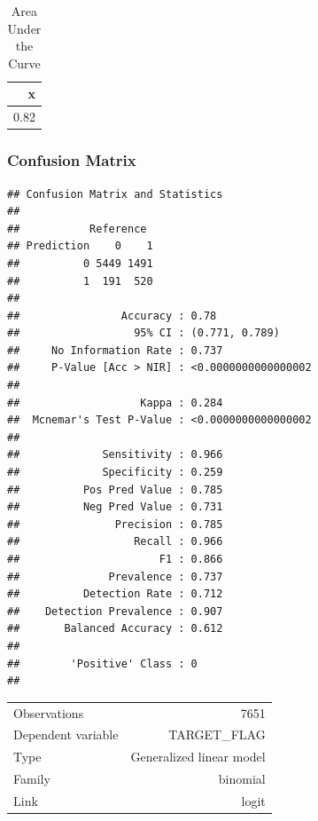 \documentclass[]{article}
\begin{document}
\begin{table}

\caption{\label{tab:t9}Area Under the Curve}
\centering
\begin{tabular}[t]{r}
\hline
x\\
\hline
0.82\\
\hline
\end{tabular}
\end{table}

\subsubsection{Confusion Matrix}\label{confusion-matrix-2}

\begin{verbatim}
## Confusion Matrix and Statistics
## 
##           Reference
## Prediction    0    1
##          0 5449 1491
##          1  191  520
##                                              
##                Accuracy : 0.78               
##                  95% CI : (0.771, 0.789)     
##     No Information Rate : 0.737              
##     P-Value [Acc > NIR] : <0.0000000000000002
##                                              
##                   Kappa : 0.284              
##  Mcnemar's Test P-Value : <0.0000000000000002
##                                              
##             Sensitivity : 0.966              
##             Specificity : 0.259              
##          Pos Pred Value : 0.785              
##          Neg Pred Value : 0.731              
##               Precision : 0.785              
##                  Recall : 0.966              
##                      F1 : 0.866              
##              Prevalence : 0.737              
##          Detection Rate : 0.712              
##    Detection Prevalence : 0.907              
##       Balanced Accuracy : 0.612              
##                                              
##        'Positive' Class : 0                  
## 
\end{verbatim}

\newpage

\begin{table}[!h]
\centering
\begin{tabular}{lr}
\toprule
\rowcolor{gray!6}  Observations & 7651\\
Dependent variable & TARGET\_FLAG\\
\rowcolor{gray!6}  Type & Generalized linear model\\
Family & binomial\\
\rowcolor{gray!6}  Link & logit\\
\bottomrule
\end{tabular}
\end{table}
\end{document}
